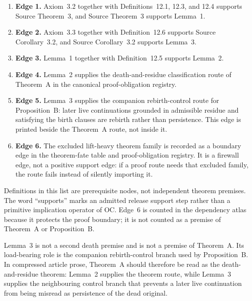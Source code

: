 \begin{enumerate}
\item \textbf{Edge 1.} Axiom~3.2 together with Definitions~12.1, 12.3, and
      12.4 supports Source Theorem~3, and Source Theorem~3 supports Lemma~1.
\item \textbf{Edge 2.} Axiom~3.3 together with Definition~12.6 supports
      Source Corollary~3.2, and Source Corollary~3.2 supports Lemma~3.
\item \textbf{Edge 3.} Lemma~1 together with Definition~12.5 supports
      Lemma~2.
\item \textbf{Edge 4.} Lemma~2 supplies the death-and-residue classification
      route of Theorem~A in the canonical proof-obligation registry.
\item \textbf{Edge 5.} Lemma~3 supplies the companion rebirth-control route
      for Proposition~B: later live continuations grounded in admissible
      residue and satisfying the birth clauses are rebirth rather than
      persistence. This edge is printed beside the Theorem~A route, not inside
      it.
\item \textbf{Edge 6.} The excluded lift-heavy theorem family is recorded as a
      boundary edge in the theorem-fate table and proof-obligation registry. It
      is a firewall edge, not a positive support edge: if a proof route needs
      that excluded family, the route fails instead of silently importing it.
\end{enumerate}

Definitions in this list are prerequisite nodes, not independent theorem
premises. The word ``supports'' marks an admitted release support step rather
than a primitive implication operator of OC. Edge~6 is counted in the dependency
atlas because it protects the proof boundary; it is not counted as a premise of
Theorem~A or Proposition~B.

Lemma~3 is not a second death premise and is not a premise of Theorem~A. Its
load-bearing role is the companion rebirth-control branch used by
Proposition~B. In compressed article prose, Theorem~A should therefore be read
as the death-and-residue theorem: Lemma~2 supplies the theorem route, while
Lemma~3 supplies the neighbouring control branch that prevents a later live
continuation from being misread as persistence of the dead original.

